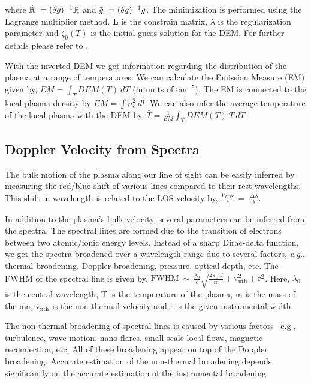 where $\Tilde{\mathbb{R}}~=(\delta g)^{-1}\mathbb{R}$ and $\Tilde{g}~=(\delta g)^{-1} g$. The minimization is performed using the Lagrange multiplier method. {\bf L} is the constrain matrix, $\lambda$ is the regularization parameter and $\zeta_{0}(T)$ is the initial guess solution for the DEM. For further details please refer to \cite{hannah&kontar12}.

With the inverted DEM we get information regarding the distribution of the plasma at a range of temperatures. We can calculate the Emission Measure (EM) given by, $EM=\int_{T}DEM(T)~dT$ (in units of $\mathrm{cm^{-5}}$). The EM is connected to the local plasma density by $EM=\int n_{e}^{2}~dl$. We can also infer the average temperature of the local plasma with the DEM by, $\bar{T}=\frac{1}{EM}\int_{T}DEM(T)~T~dT$.

\subsection{Doppler Velocity from Spectra}

The bulk motion of the plasma along our line of sight can be easily inferred by measuring the red/blue shift of various lines compared to their rest wavelengths. This shift in wavelength is related to the LOS velocity by, $\frac{V_{LOS}}{c}~=~\frac{\Delta \lambda}{\lambda}$.

In addition to the plasma's bulk velocity, several parameters can be inferred from the spectra. The spectral lines are formed due to the transition of electrons between two atomic/ionic energy levels. Instead of a sharp Dirac-delta function, we get the spectra broadened over a wavelength range due to several factors, {\it e.g.}, thermal broadening, Doppler broadening, pressure, optical depth, etc. The FWHM of the spectral line is given by, $\mathrm{FWHM~\sim~\frac{\lambda_{0}}{c}\sqrt{\frac{2k_{B}T}{m}+v_{nth}^{2}+r^{2}}}$. Here, $\lambda_{0}$ is the central wavelength, T is the temperature of the plasma, m is the mass of the ion, $\mathrm{v_{nth}}$ is the non-thermal velocity and r is the given instrumental width. 

The non-thermal broadening of spectral lines is caused by various factors {\, e.g.}, turbulence, wave motion, nano flares, small-scale local flows, magnetic reconnection, etc. All of these broadening appear on top of the Doppler broadening. Accurate estimation of the non-thermal broadening depends significantly on the accurate estimation of the instrumental broadening.

